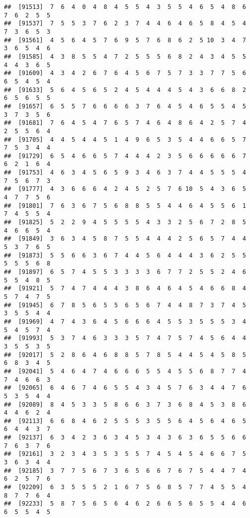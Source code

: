 \documentclass[
]{book}
\begin{document}
\begin{verbatim}
##  [91513]  7  6  4  0  4  8  4  5  5  4  3  5  5  4  6  5  4  8  6  7  6  2  5  5
##  [91537]  7  5  5  3  7  6  2  3  7  4  4  6  4  6  5  8  4  5  4  7  3  6  5  3
##  [91561]  4  5  6  4  5  7  6  9  5  7  6  8  6  2  5 10  3  4  7  3  6  5  4  6
##  [91585]  4  3  8  5  5  4  7  2  5  5  5  6  8  2  4  3  4  5  5  4  4  3  6  5
##  [91609]  4  3  4  2  6  7  6  4  5  6  7  5  7  3  3  7  7  5  6  6  5  4  5  4
##  [91633]  5  6  4  5  6  5  2  4  5  4  4  4  5  4  3  6  6  8  2  6  5  6  5  5
##  [91657]  6  5  5  7  6  6  6  6  3  7  6  4  5  4  6  5  5  4  5  3  7  3  5  6
##  [91681]  7  6  4  5  4  7  6  5  7  4  6  4  8  6  4  2  5  7  4  2  5  5  6  4
##  [91705]  4  4  5  4  4  5  1  4  9  6  5  3  5  4  4  6  6  5  7  7  5  3  4  4
##  [91729]  6  5  4  6  6  5  7  4  4  4  2  3  5  6  6  6  6  6  7  6  2  1  6  4
##  [91753]  4  6  3  4  5  6  5  9  3  4  6  3  7  4  4  5  5  5  4  7  5  6  7  3
##  [91777]  4  3  6  6  6  4  2  4  5  2  5  7  6 10  5  4  3  6  5  4  7  7  5  6
##  [91801]  7  6  3  6  7  5  6  8  8  5  5  4  4  6  4  5  5  6  1  7  4  5  5  4
##  [91825]  5  2  2  9  4  5  5  5  5  4  3  3  2  5  6  7  2  8  5  4  6  6  5  4
##  [91849]  3  6  3  4  5  8  7  5  5  4  4  4  2  5  6  5  7  4  4  5  3  7  6  5
##  [91873]  5  5  6  6  3  6  7  4  4  5  6  4  4  4  3  6  2  5  5  5  5  5  6  8
##  [91897]  6  5  7  4  5  5  3  3  3  3  6  7  7  2  5  5  2  4  6  5  5  4  8  5
##  [91921]  5  7  4  7  4  4  4  3  8  6  4  6  4  5  4  6  6  8  4  5  7  4  7  5
##  [91945]  6  7  8  5  6  5  5  6  5  6  7  4  4  8  7  3  7  4  5  3  5  5  4  4
##  [91969]  4  7  4  3  6  4  5  6  6  6  4  5  5  3  5  5  5  3  4  5  4  5  7  4
##  [91993]  5  3  7  4  6  3  3  3  5  7  4  7  5  7  4  5  6  4  4  3  5  5  3  5
##  [92017]  5  2  8  6  4  6  8  8  5  7  8  5  4  4  5  4  5  8  5  6  8  3  4  5
##  [92041]  5  4  6  4  7  4  6  6  6  5  5  4  5  5  6  8  7  7  4  7  4  6  6  3
##  [92065]  6  4  6  7  4  6  5  5  4  3  4  5  7  6  3  4  4  7  6  5  3  5  4  4
##  [92089]  8  4  5  3  3  5  8  6  6  3  7  3  6  8  4  5  3  8  6  4  4  6  2  4
##  [92113]  6  6  8  4  6  2  5  5  5  3  5  5  6  4  5  6  4  6  5  6  4  4  3  7
##  [92137]  6  3  4  2  3  6  3  4  5  3  4  3  6  3  6  5  5  6  6  7  6  3  7  6
##  [92161]  3  2  3  4  3  5  3  5  5  7  4  5  4  5  4  6  6  7  5  3  6  3  4  4
##  [92185]  3  7  7  5  6  7  3  6  5  6  6  7  6  7  5  4  4  7  4  6  2  5  7  6
##  [92209]  6  3  5  5  5  2  1  6  7  5  6  8  5  7  7  4  5  5  4  8  7  7  6  4
##  [92233]  5  8  7  5  6  5  6  4  6  2  6  6  5  6  5  5  4  4  6  6  5  5  4  5

\end{verbatim}
\end{document}

